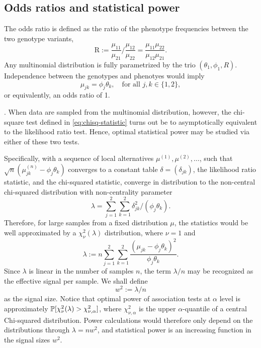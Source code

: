 \subsection{Odds ratios and statistical power}
\label{subsec:odds-and-power}

The odds ratio is defined as the ratio of the phenotype frequencies between the two genotype variants,
\begin{equation} \label{eq:odds-ratio}
    \text{R} := \frac{\mu_{11}}{\mu_{21}}\Big/\frac{\mu_{12}}{\mu_{22}}
    = \frac{\mu_{11}\mu_{22}}{\mu_{12}\mu_{21}}.
\end{equation}
Any multinomial distribution is fully parametrized by the trio $(\theta_1, \phi_1, R)$.
Independence between the genotypes and phenotyes would imply
$$
\mu_{jk} = \phi_j\theta_k, \quad \text{for all }j,k \in\{1,2\},
$$
or equivalently, an odds ratio of 1.

 \cite{gao2019upass}.
When data are sampled from the multinomial distribution, however, the chi-square test defined in \eqref{eq:chisq-statistic} turns out be to asymptotically equivalent to the likelihood ratio test.
Hence, optimal statistical power may be studied via either of these two tests.

Specifically, with a sequence of local alternatives $\mu^{(1)}, \mu^{(2)}, \ldots$, such that $\sqrt{n}(\mu^{(n)}_{jk} - \phi_j\theta_k)$ converges to a constant table $\delta = (\delta_{jk})$, the likelihood ratio statistic, and the chi-squared statistic, converge in distribution to the non-central chi-squared distribution with non-centrality parameter 
$$\lambda = \sum_{j=1}^2 \sum_{k=1}^2 {\delta_{jk}^2}/{(\phi_j\theta_k)}.$$
Therefore, for large samples from a fixed distribution $\mu$, the statistics would be well approximated by a $\chi^2_\nu(\lambda)$ distribution, where $\nu=1$ and
\begin{equation} 
    \lambda := n\sum_{j=1}^2 \sum_{k=1}^2 \frac{(\mu_{jk} - \phi_j\theta_k)^2}{\phi_j\theta_k}.
\end{equation}
Since $\lambda$ is linear in the number of samples $n$, the term $\lambda/n$ may be recognized as the effective signal per sample.
We shall define 
\begin{equation} \label{eq:signal-size-chisq}
    w^2:=\lambda/n
\end{equation} 
as the signal size.
Notice that optimal power of association tests at $\alpha$ level is approximately $\P[\chi^2_{\nu}(\lambda)>\chi^2_{\nu,\alpha}]$, where $\chi^2_{\nu,\alpha}$ is the upper $\alpha$-quantile of a central Chi-squared distribution.
Power calculations would therefore only depend on the distributions through $\lambda=nw^2$, and statistical power is an increasing function in the signal sizes $w^2$.

